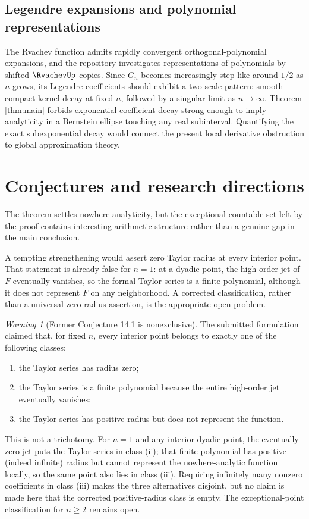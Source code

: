 \documentclass[11pt,oneside]{article}
\theoremstyle{definition}
\theoremstyle{remark}
\newtheorem{warning}[theorem]{Warning}
\begin{document}
\subsection{Legendre expansions and polynomial representations}

The Rvachev function admits rapidly convergent orthogonal-polynomial expansions, and
the repository investigates representations of polynomials by shifted $\RvachevUp$ copies.
Since $G_n$ becomes increasingly step-like around $1/2$ as $n$ grows, its Legendre
coefficients should exhibit a two-scale pattern: smooth compact-kernel decay at fixed
$n$, followed by a singular limit as $n\to\infty$.  Theorem \ref{thm:main} forbids
exponential coefficient decay strong enough to imply analyticity in a Bernstein
ellipse touching any real subinterval.  Quantifying the exact subexponential decay
would connect the present local derivative obstruction to global approximation theory.

\section{Conjectures and research directions}
\label{sec:future}

The theorem settles nowhere analyticity, but the exceptional countable set left by the
proof contains interesting arithmetic structure rather than a genuine gap in the main
conclusion.

A tempting strengthening would assert zero Taylor radius at every interior point.
That statement is already false for $n=1$: at a dyadic point, the high-order jet of
$F$ eventually vanishes, so the formal Taylor series is a finite polynomial, although
it does not represent $F$ on any neighborhood.  A corrected classification, rather
than a universal zero-radius assertion, is the appropriate open problem.

\begin{warning}[Former Conjecture 14.1 is nonexclusive]
\label{warn:trichotomy}
The submitted formulation claimed that, for fixed $n$, every interior point belongs
to exactly one of the following classes:
\begin{enumerate}[label=(\roman*)]
 \item the Taylor series has radius zero;
 \item the Taylor series is a finite polynomial because the entire high-order jet
 eventually vanishes;
 \item the Taylor series has positive radius but does not represent the function.
\end{enumerate}
This is not a trichotomy.  For $n=1$ and any interior dyadic point, the eventually
zero jet puts the Taylor series in class (ii); that finite polynomial has positive
(indeed infinite) radius but cannot represent the nowhere-analytic function locally,
so the same point also lies in class (iii).  Requiring infinitely many nonzero
coefficients in class (iii) makes the three alternatives disjoint, but no claim is
made here that the corrected positive-radius class is empty.  The exceptional-point
classification for $n\geq2$ remains open.
\end{warning}
\end{document}
